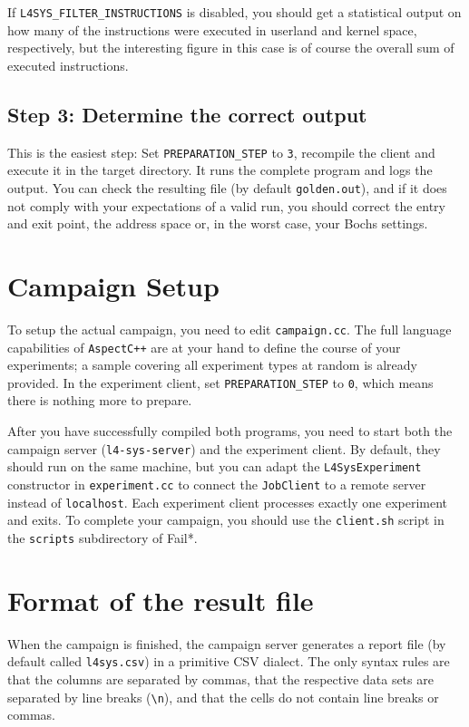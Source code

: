 \documentclass[a4paper,10pt]{article}
\begin{document}
If \verb+L4SYS_FILTER_INSTRUCTIONS+ is disabled, you should
get a statistical output on how many of the instructions
were executed in userland and kernel space, respectively,
but the interesting figure in this case is of course the overall
sum of executed instructions.

\subsection{Step 3: Determine the correct output}

This is the easiest step: Set \verb+PREPARATION_STEP+ to \texttt{3},
recompile the client and execute it in the target directory.
It runs the complete program and logs the output. You can
check the resulting file (by default \texttt{golden.out}),
and if it does not comply with your expectations of a valid
run, you should correct the entry and exit point, the address space
or, in the worst case, your Bochs settings.

\section{Campaign Setup}

To setup the actual campaign, you need to edit \texttt{campaign.cc}.
The full language capabilities of \texttt{AspectC++} are at your hand to define
the course of your experiments; a sample covering all experiment
types at random is already provided. In the experiment client,
set \verb+PREPARATION_STEP+ to \texttt{0}, which means there is nothing more
to prepare.

After you have successfully compiled both programs, you need to
start both the campaign server (\texttt{l4-sys-server})
and the experiment client. By default, they should run on the
same machine, but you can adapt the \texttt{L4SysExperiment}
constructor in \texttt{experiment.cc} to connect the \texttt{JobClient}
to a remote server instead of \texttt{localhost}. Each experiment client processes
exactly one experiment and exits. To complete your campaign,
you should use the \texttt{client.sh} script in the \texttt{scripts}
subdirectory of Fail*.

\section{Format of the result file}

When the campaign is finished, the campaign server generates a report
file (by default called \texttt{l4sys.csv}) in a primitive CSV dialect.
The only syntax rules are that the columns are separated by commas,
that the respective data sets are separated by line breaks (\verb+\n+),
and that the cells do not contain line breaks or commas.
\end{document}
